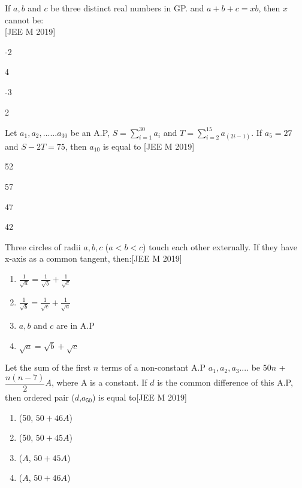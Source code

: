 \documentclass[journal,12pt,twocolumn]{IEEEtran}
\theoremstyle{remark}
\begin{document}
\begin{enumerate}
{{\begin{enumerate}
  \end{enumerate}}
  \item{If $a, b$ and $c$ be three distinct real numbers in GP. and $a+b+c=xb$, then $x$ cannot be:\\ \null \hfill{[JEE M 2019]}
\begin{enumerate}
  \begin{multicols}{2}
  \item {-2} \item{4}\columnbreak
  \item{-3}
  \item{2}
  \end{multicols}
  \end{enumerate}}
  \item {Let $a_{1},a_{2},......a_{30}$ be an A.P, $S=\sum_{i=1}^{30}a_{i}$ and $T=\sum_{i=2}^{15}a_{(2i-1)}$. If $a_{5}=27$
	  and $S-2T=75$, then $a_{10}$ is equal to \null \hfill{[JEE M 2019]}
\begin{enumerate}
  \begin{multicols}{2}
  \item {52} \item{57}\columnbreak
  \item{47}
  \item{42}
  \end{multicols}
  \end{enumerate}}
\item{Three circles of radii $a, b, c$ ($a<b<c$) touch each other externally. If they have x-axis as a common tangent, then:\hfill{[JEE M 2019]}\begin{enumerate} \itemsep.5em	
  
  \item {$\frac{1}{\sqrt{a}}=\frac{1}{\sqrt{b}}+\frac{1}{\sqrt{c}}$} 
  \item {$\frac{1}{\sqrt{b}}=\frac{1}{\sqrt{c}}+\frac{1}{\sqrt{a}}$} 
  \item{$a,b$ and $c$ are in A.P}
  \item{${\sqrt{a}}={\sqrt{b}}+{\sqrt{c}}$}
  \end{enumerate}} 
  \item{Let the sum of the first $n$ terms of a non-constant A.P $a_{1},a_{2},a_{3}$.... be $50n$ + $\dfrac{n(n-7)}{2}A$, where A is a constant. If $d$ is the common difference of this A.P, then ordered pair ($d$,$a_{50}$) is equal to\hfill{[JEE M 2019]}} \vspace{.5em}\begin{enumerate}
		  \itemsep.5em  \item {(50, $50+46A$)} \item{(50, $50+45A$)}
  \item{($A$, $50+45A$)}
  \item{($A$, $50+46A$)}
  \end{enumerate}}
  \end{enumerate}
\end{document}
